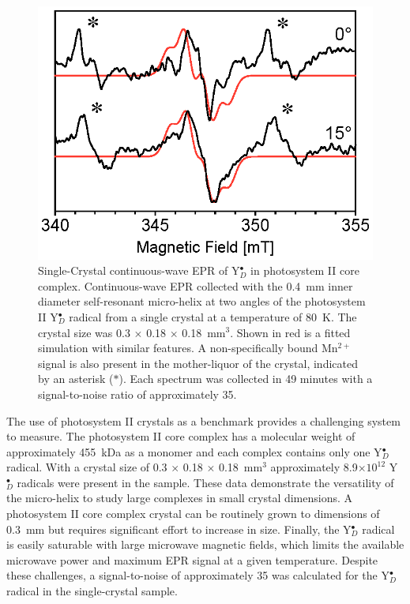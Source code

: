 \begin{figure}[htb]
\centering
 \includegraphics{Kapitel/Ch4-Images/03-PSII-xTal-Data.eps}
 \caption[Single-Crystal CW EPR of Y$_D^\bullet$ in the photosystem II core complex.]{Single-Crystal continuous-wave EPR of Y$_D^\bullet$ in photosystem II core complex. Continuous-wave EPR collected with the 0.4~mm inner diameter self-resonant micro-helix at two angles of the photosystem II Y$_D^\bullet$ radical from a single crystal at a temperature of 80~K. The crystal size was 0.3 $\times$ 0.18 $\times$ 0.18~mm$^3$. Shown in red is a fitted simulation with similar features. A non-specifically bound Mn$^{2+}$ signal is also present in the mother-liquor of the crystal, indicated by an asterisk (\mbox{\large $\ast$}). Each spectrum was collected in 49 minutes with a signal-to-noise ratio of approximately 35.}
 \label{fig:xTalPSII}
\end{figure}

The use of photosystem II crystals as a benchmark provides a challenging system to measure. The photosystem II core complex has a molecular weight of approximately 455~kDa as a monomer and each complex contains only one Y$_D^\bullet$ radical. With a crystal size of 0.3 $\times$ 0.18 $\times$ 0.18~mm$^3$ approximately 8.9$\times10^{12}$ Y$_D^\bullet$ radicals were present in the sample. These data demonstrate the versatility of the micro-helix to study large complexes in small crystal dimensions. A photosystem II core complex crystal can be routinely grown to dimensions of 0.3~mm but requires significant effort to increase in size. Finally, the Y$_D^\bullet$ radical is easily saturable with large microwave magnetic fields, which limits the available microwave power and maximum EPR signal at a given temperature. Despite these challenges, a signal-to-noise of approximately 35 was calculated for the Y$_D^\bullet$ radical in the single-crystal sample. 

